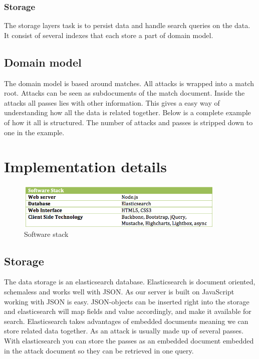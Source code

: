 \subsubsection{Storage}

The storage layers task is to persist data and handle search queries on the data. It consist of several indexes that each store a part of domain model. 

\subsection{Domain model}

The domain model is based around matches. All attacks is wrapped into a match root. Attacks can be seen as subdocuments of the match document. Inside the attacks all passes lies with other information. This gives a easy way of understanding how all the data is related together. Below is a complete example of how it all is structured. The number of attacks and passes is stripped down to one in the example.



\section{Implementation details}

\begin{figure}[ht!]
\centering
\includegraphics[width=100mm]{images/implementation/software_stack.png}
\caption{Software stack}
\label{overflow}
\end{figure}

\subsection{Storage}

The data storage is an elasticsearch database\cite{elasticsearch:mainsite}. Elasticsearch is document oriented, schemaless and works well with JSON\footnotemark. As our server is built on JavaScript working with JSON is easy. JSON-objects can be inserted right into the storage and elasticsearch will map fields and value accordingly, and make it available for search.
Elasticsearch takes advantages of embedded documents meaning we can store related data together. As an attack is usually made up of several passes. With elasticsearch you can store the passes as an embedded document embedded in the attack document so they can be retrieved in one query. 

